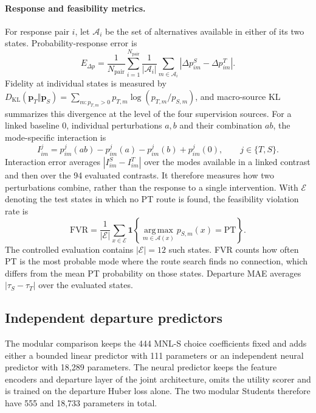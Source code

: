 \paragraph{Response and feasibility metrics.}
\label{sec:metric_definitions}
For response pair $i$, let $\mathcal A_i$ be the set of alternatives available in either of its two states. Probability-response error is
\begin{equation}
 E_{\Delta p}=\frac{1}{N_{\mathrm{pair}}}\sum_{i=1}^{N_{\mathrm{pair}}}
 \frac{1}{|\mathcal A_i|}\sum_{m\in\mathcal A_i}
 |\Delta p^S_{im}-\Delta p^T_{im}|.
 \label{eq:response_metric}
\end{equation}
Fidelity at individual states is measured by $D_{\mathrm{KL}}(\mathbf p_T\Vert\mathbf p_S)=\sum_{m:p_{T,m}>0}p_{T,m}\log(p_{T,m}/p_{S,m})$, and macro-source KL summarizes this divergence at the level of the four supervision sources. For a linked baseline $0$, individual perturbations $a,b$ and their combination $ab$, the mode-specific interaction is
\begin{equation}
 I^j_{im}=p^j_{im}(ab)-p^j_{im}(a)-p^j_{im}(b)+p^j_{im}(0),\qquad j\in\{T,S\}.
 \label{eq:interaction_metric}
\end{equation}
Interaction error averages $|I^S_{im}-I^T_{im}|$ over the modes available in a linked contrast and then over the 94 evaluated contrasts. It therefore measures how two perturbations combine, rather than the response to a single intervention. With $\mathcal E$ denoting the test states in which no PT route is found, the feasibility violation rate is
\begin{equation}
 \mathrm{FVR}=\frac{1}{|\mathcal E|}\sum_{x\in\mathcal E}
 \mathbf 1\!\left\{\operatorname*{arg\,max}_{m\in\mathcal A(x)}p_{S,m}(x)=\mathrm{PT}\right\}.
 \label{eq:fvr_metric}
\end{equation}
The controlled evaluation contains $|\mathcal E|=12$ such states. FVR counts how often PT is the most probable mode where the route search finds no connection, which differs from the mean PT probability on those states. Departure MAE averages $|\tau_S-\tau_T|$ over the evaluated states.



\subsection{Independent departure predictors}
\label{sec:departure_predictors}
The modular comparison keeps the 444 MNL-S choice coefficients fixed and adds either a bounded linear predictor with 111 parameters or an independent neural predictor with 18,289 parameters. The neural predictor keeps the feature encoders and departure layer of the joint architecture, omits the utility scorer and is trained on the departure Huber loss alone. The two modular Students therefore have 555 and 18,733 parameters in total.

